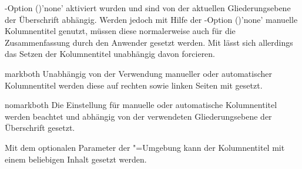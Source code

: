 \begin{Declaration*}{}
\begin{Declaration*}{}
\begin{Declaration*}{}
\begin{Declaration}[%
  v2.02!\Option{abstract=multiple}:ersetzt \Option{abstract=double};%
  v2.02!\Option{abstract=tocleveldown};%
  v2.02!\Option{abstract=markboth};%
  v2.04!\Option{abstract=tocmultiple}%
]{}
\KOMAScript-Option ()'none' 
aktiviert wurden und sind von der aktuellen Gliederungsebene der Überschrift 
abhängig. Werden jedoch mit Hilfe der \KOMAScript-Option 
()'none' manuelle Kolumnentitel 
genutzt, müssen diese normalerweise auch für die Zusammenfassung durch den 
Anwender gesetzt werden. Mit  lässt sich allerdings 
das Setzen der Kolumnentitel unabhängig davon forcieren.
%
\begin{values}{}
\item[markboth]
  Unabhängig von der Verwendung manueller oder automatischer Kolumnentitel 
  werden diese auf rechten sowie linken Seiten mit  gesetzt.
\item[nomarkboth]
  Die Einstellung für manuelle oder automatische Kolumnentitel werden beachtet 
  und abhängig von der verwendeten Gliederungsebene der Überschrift gesetzt.
\end{values}
%
Mit dem optionalen Parameter  der 
"=Umgebung kann der Kolumnentitel mit einem beliebigen 
Inhalt gesetzt werden.


\end{Declaration}
\end{Declaration*}
\end{Declaration*}
\end{Declaration*}
